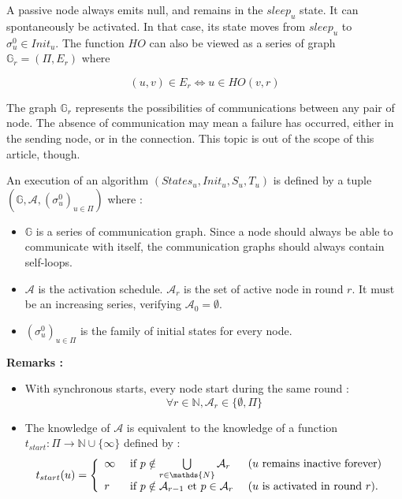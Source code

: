 \documentclass{article}
\begin{document}
A passive node always emits null, and remains in the $sleep_u$ state.
It can spontaneously be activated. In that case, its state moves from $sleep_u$ to $\sigma^0_u \in Init_u$.
The function $HO$ can also be viewed as a series of graph $\mathds{G}_r = (\Pi, E_r)$ where

$$(u, v) \in E_r \Leftrightarrow u \in HO(v, r)$$

The graph $\mathds{G}_r$ represents the possibilities of communications between any pair of node.
The absence of communication may mean a failure has occurred, either in the sending node, or in the connection.
This topic is out of the scope of this article, though.

An execution of an algorithm $(States_u, Init_u, S_u, T_u)$ is defined by a tuple
$(\mathds{G}, \mathcal{A}, (\sigma^0_u)_{u \in \Pi})$ where :

\begin{itemize}
	\item $\mathds{G}$ is a series of communication graph. Since a node should always be able to communicate 
		with itself, the communication graphs should always contain self-loops.
	\item $\mathcal{A}$ is the activation schedule. $\mathcal{A}_r$ is the set of active node in round $r$.
		It must be an increasing series, verifying $\mathcal{A}_0 = \emptyset$.
	\item $(\sigma^0_u)_{u \in \Pi}$ is the family of initial states for every node.
\end{itemize}

\textbf{Remarks :}

\begin{itemize}
	\item With synchronous starts, every node start during the same round : 
		$$\forall r \in \mathds{N}, \mathcal{A}_r \in \{\emptyset, \Pi\}$$

	\item The knowledge of $\mathcal{A}$ is equivalent to the knowledge of a function
		$t_{start} : \Pi \rightarrow \mathds{N} \cup \{\infty\}$ defined by :
		$$t_{start}(u) = \left \{ \begin{array}{l ll}
		  \infty & \mbox{ if  } p \notin \bigcup\limits_{r \in \mathds{N}}  \mathcal{A}_r & 
			  \mbox { ($u$ remains inactive forever) } \\
		  r  & \mbox{ if  } p \notin \mathcal{A}_{r-1} \mbox{ et } p \in \mathcal{A}_{r}  &
			  \mbox{ ($u$ is activated in round $r$)}.
		  \end{array} \right.$$

\end{itemize}
\end{document}
